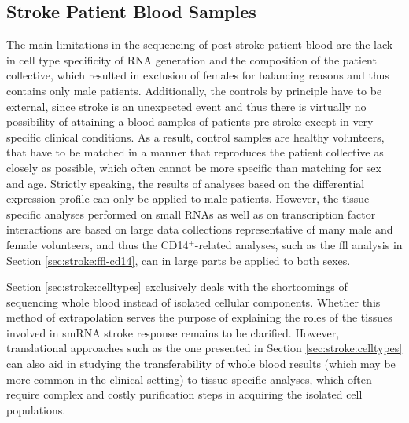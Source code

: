 \subsection{Stroke Patient Blood Samples} \label{sec:discussion:stroke-blood}
The main limitations in the sequencing of post-stroke patient blood are the lack in cell type specificity of RNA generation and the composition of the patient collective, which resulted in exclusion of females for balancing reasons and thus contains only male patients. Additionally, the controls by principle have to be external, since stroke is an unexpected event and thus there is virtually no possibility of attaining a blood samples of patients pre-stroke except in very specific clinical conditions. As a result, control samples are healthy volunteers, that have to be matched in a manner that reproduces the patient collective as closely as possible, which often cannot be more specific than matching for sex and age. Strictly speaking, the results of analyses based on the differential expression profile can only be applied to male patients. However, the tissue-specific analyses performed on small RNAs as well as on transcription factor interactions are based on large data collections representative of many male and female volunteers, and thus the CD14$^+$-related analyses, such as the \acf{ffl} analysis in Section \ref{sec:stroke:ffl-cd14}, can in large parts be applied to both sexes.

Section \ref{sec:stroke:celltypes} exclusively deals with the shortcomings of sequencing whole blood instead of isolated cellular components. Whether this method of extrapolation serves the purpose of explaining the roles of the tissues involved in smRNA stroke response remains to be clarified. However, translational approaches such as the one presented in Section \ref{sec:stroke:celltypes} can also aid in studying the transferability of whole blood results (which may be more common in the clinical setting) to tissue-specific analyses, which often require complex and costly purification steps in acquiring the isolated cell populations.

